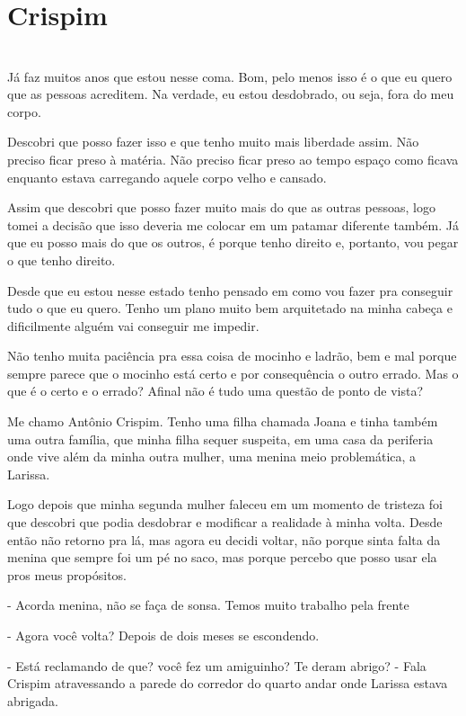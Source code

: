 
\newpage


\ifdefined\useChapters
\chapter{Crispim}
\else
\chapter{}
\fi
Já faz muitos anos que estou nesse coma. Bom, pelo menos isso é o que eu quero que as pessoas acreditem. Na verdade, eu estou desdobrado, ou seja, fora do meu corpo.

Descobri que posso fazer isso e que tenho muito mais liberdade assim. Não preciso ficar preso à matéria. Não preciso ficar preso ao tempo espaço como ficava enquanto estava carregando aquele corpo velho e cansado.

Assim que descobri que posso fazer muito mais do que as outras pessoas, logo tomei a decisão que isso deveria me colocar em um patamar diferente também. Já que eu posso mais do que os outros, é porque tenho direito e, portanto, vou pegar o que tenho direito.

Desde que eu estou nesse estado tenho pensado em como vou fazer pra conseguir tudo o que eu quero. Tenho um plano muito bem arquitetado na minha cabeça e dificilmente alguém vai conseguir me impedir. 

Não tenho muita paciência pra essa coisa de mocinho e ladrão, bem e mal porque sempre parece que o mocinho está certo e por consequência o outro errado. Mas o que é o certo e o errado? Afinal não é tudo uma questão de ponto de vista?

Me chamo Antônio Crispim. Tenho uma filha chamada Joana e tinha também uma outra família, que minha filha sequer suspeita, em uma casa da periferia onde vive além da minha outra mulher, uma menina meio problemática, a Larissa. 

Logo depois que minha segunda mulher faleceu em um momento de tristeza foi que descobri que podia desdobrar e modificar a realidade à minha volta. Desde então não retorno pra lá, mas agora eu decidi voltar, não porque sinta falta da menina que sempre foi um pé no saco, mas porque percebo que posso usar ela pros meus propósitos.

- Acorda menina, não se faça de sonsa. Temos muito trabalho pela frente

- Agora você volta? Depois de dois meses se escondendo.

- Está reclamando de que? você fez um amiguinho? Te deram abrigo? - Fala Crispim atravessando a parede do corredor do quarto andar onde Larissa estava abrigada.

